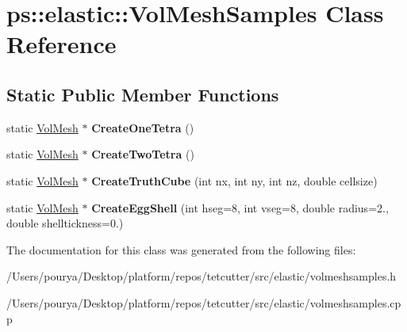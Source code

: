 \hypertarget{classps_1_1elastic_1_1VolMeshSamples}{}\section{ps\+:\+:elastic\+:\+:Vol\+Mesh\+Samples Class Reference}
\label{classps_1_1elastic_1_1VolMeshSamples}
\subsection*{Static Public Member Functions}
\begin{DoxyCompactItemize}
\item 
\hypertarget{classps_1_1elastic_1_1VolMeshSamples_ab646cb5adc1159134cadb15d4aeab725}{}static \hyperlink{classps_1_1elastic_1_1VolMesh}{Vol\+Mesh} $\ast$ {\bfseries Create\+One\+Tetra} ()\label{classps_1_1elastic_1_1VolMeshSamples_ab646cb5adc1159134cadb15d4aeab725}

\item 
\hypertarget{classps_1_1elastic_1_1VolMeshSamples_a9714e74fdb2278620bc5175968d5cca4}{}static \hyperlink{classps_1_1elastic_1_1VolMesh}{Vol\+Mesh} $\ast$ {\bfseries Create\+Two\+Tetra} ()\label{classps_1_1elastic_1_1VolMeshSamples_a9714e74fdb2278620bc5175968d5cca4}

\item 
\hypertarget{classps_1_1elastic_1_1VolMeshSamples_aa5fc08abcfb02dbe1b5d98f773b23312}{}static \hyperlink{classps_1_1elastic_1_1VolMesh}{Vol\+Mesh} $\ast$ {\bfseries Create\+Truth\+Cube} (int nx, int ny, int nz, double cellsize)\label{classps_1_1elastic_1_1VolMeshSamples_aa5fc08abcfb02dbe1b5d98f773b23312}

\item 
\hypertarget{classps_1_1elastic_1_1VolMeshSamples_aaa87a306a911ad42bcd15753f1d683ed}{}static \hyperlink{classps_1_1elastic_1_1VolMesh}{Vol\+Mesh} $\ast$ {\bfseries Create\+Egg\+Shell} (int hseg=8, int vseg=8, double radius=2., double shelltickness=0.)\label{classps_1_1elastic_1_1VolMeshSamples_aaa87a306a911ad42bcd15753f1d683ed}

\end{DoxyCompactItemize}


The documentation for this class was generated from the following files\+:\begin{DoxyCompactItemize}
\item 
/\+Users/pourya/\+Desktop/platform/repos/tetcutter/src/elastic/volmeshsamples.\+h\item 
/\+Users/pourya/\+Desktop/platform/repos/tetcutter/src/elastic/volmeshsamples.\+cpp\end{DoxyCompactItemize}
